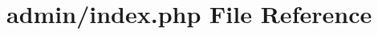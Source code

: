 \hypertarget{admin_2index_8php}{\section{admin/index.php File Reference}
\label{admin_2index_8php}
}

